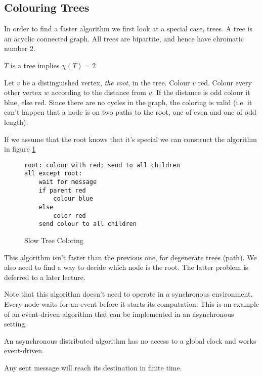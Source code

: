 \subsection{Colouring Trees}

In order to find a faster algorithm we first look at a special case, trees. A tree is an acyclic connected graph. All trees are bipartite, and hence have chromatic number 2.

\begin{thm} $T$ is a tree implies $\chi(T)=2$ \end{thm}

\begin{pr} Let $v$ be a distinguished vertex, \emph{the root}, in the tree. Colour $v$ red.  Colour every other vertex $w$ according to the distance from $v$. If the distance is odd colour it blue, else red. Since there are no cycles in the graph, the coloring is valid (i.e. it can't happen that a node is on two paths to the root, one of even and one of odd length).
\end{pr}

If we assume that the root knows that it's special we can construct the algorithm in figure \ref{alg:slow_tree_colour}

\begin{figure}[hbt]
\begin{lstlisting}
root: colour with red; send to all children
all except root: 
	wait for message
	if parent red
		colour blue
	else
		color red
	send colour to all children
\end{lstlisting}
\caption{Slow Tree Coloring}
\label{alg:slow_tree_colour}
\end{figure}


This algorithm isn't faster than the previous one, for degenerate trees (path). We also need to find a way to decide which node is the root. The latter problem is deferred to a later lecture.

Note that this algorithm doesn't need to operate in a synchronous environment. Every node waits for an event before it starts its computation. This is an example of an event-driven algorithm that can be implemented in an asynchronous setting.

\begin{Def}[Asynchronous DA] An asynchronous distributed algorithm has no access to a global clock and works event-driven.

Any sent message will reach its destination in finite time.
\end{Def}


